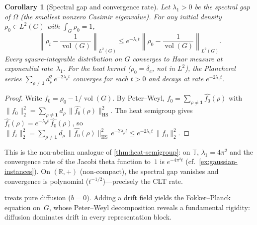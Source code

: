 \documentclass[12pt]{amsart}
\newtheorem{corollary}[theorem]{Corollary}
\theoremstyle{definition}
\theoremstyle{remark}
\newcommand{\R}{\mathbb{R}}
\newcommand{\bT}{\mathbb{T}}
\begin{document}
\begin{corollary}[Spectral gap and convergence rate]\label{cor:spectral-gap}
Let $\lambda_1 > 0$ be the spectral gap of $\Omega$ (the smallest nonzero Casimir eigenvalue). For any initial density $\rho_0 \in L^2(G)$ with $\int_G \rho_0 = 1$,
\[
\left\| \rho_t - \frac{1}{\operatorname{vol}(G)} \right\|_{L^2(G)} \leq e^{-\lambda_1 t}\left\| \rho_0 - \frac{1}{\operatorname{vol}(G)} \right\|_{L^2(G)}.
\]
Every square-integrable distribution on $G$ converges to Haar measure at exponential rate~$\lambda_1$. For the heat kernel ($\rho_0 = \delta_e$, not in $L^2$), the Plancherel series $\sum_{\rho \neq \mathbf{1}} d_\rho^2\, e^{-2\lambda_\rho t}$ converges for each $t > 0$ and decays at rate $e^{-2\lambda_1 t}$.
\end{corollary}

\begin{proof}
Write $f_0 = \rho_0 - 1/\operatorname{vol}(G)$. By Peter--Weyl, $f_0 = \sum_{\rho \neq \mathbf{1}} \widehat{f_0}(\rho)$ with $\|f_0\|_2^2 = \sum_{\rho \neq \mathbf{1}} d_\rho\, \|\widehat{f_0}(\rho)\|_{\mathrm{HS}}^2$. The heat semigroup gives $\widehat{f_t}(\rho) = e^{-\lambda_\rho t}\, \widehat{f_0}(\rho)$, so $\|f_t\|_2^2 = \sum_{\rho \neq \mathbf{1}} d_\rho\, \|\widehat{f_0}(\rho)\|_{\mathrm{HS}}^2\, e^{-2\lambda_\rho t} \leq e^{-2\lambda_1 t}\, \|f_0\|_2^2$.
\end{proof}

This is the non-abelian analogue of \cref{thm:heat-semigroup}: on $\bT$, $\lambda_1 = 4\pi^2$ and the convergence rate of the Jacobi theta function to~$1$ is $e^{-4\pi^2 t}$ (cf.\ \cref{ex:gaussian-instances}). On $(\R, +)$ (non-compact), the spectral gap vanishes and convergence is polynomial ($t^{-1/2}$)---precisely the CLT rate.

 treats pure diffusion ($b = 0$). Adding a drift field yields the Fokker--Planck equation on~$G$, whose Peter--Weyl decomposition reveals a fundamental rigidity: diffusion dominates drift in every representation block.
\end{document}
